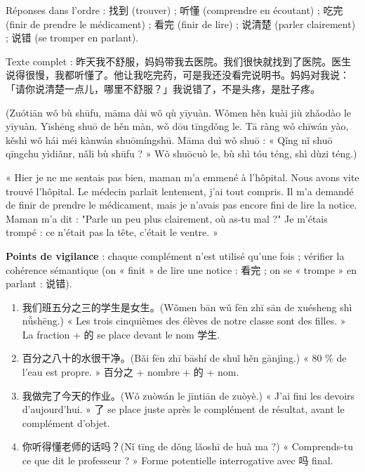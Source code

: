 \documentclass[11pt]{article}
\begin{document}
\begin{corrige}
Réponses dans l'ordre : 找到 (trouver) ; 听懂 (comprendre en écoutant) ; 吃完 (finir de prendre le médicament) ; 看完 (finir de lire) ; 说清楚 (parler clairement) ; 说错 (se tromper en parlant).

Texte complet : 昨天我不舒服，妈妈带我去医院。我们很快就找到了医院。医生说得很慢，我都听懂了。他让我吃完药，可是我还没看完说明书。妈妈对我说：「请你说清楚一点儿，哪里不舒服？」我说错了，不是头疼，是肚子疼。

(Zuótiān wǒ bù shūfu, māma dài wǒ qù yīyuàn. Wǒmen hěn kuài jiù zhǎodào le yīyuàn. Yīshēng shuō de hěn màn, wǒ dōu tīngdǒng le. Tā ràng wǒ chīwán yào, kěshì wǒ hái méi kànwán shuōmíngshū. Māma duì wǒ shuō : « Qǐng nǐ shuō qīngchu yìdiǎnr, nǎli bù shūfu ? » Wǒ shuōcuò le, bù shì tóu téng, shì dùzi téng.)

« Hier je ne me sentais pas bien, maman m'a emmené à l'hôpital. Nous avons vite trouvé l'hôpital. Le médecin parlait lentement, j'ai tout compris. Il m'a demandé de finir de prendre le médicament, mais je n'avais pas encore fini de lire la notice. Maman m'a dit : "Parle un peu plus clairement, où as-tu mal ?" Je m'étais trompé : ce n'était pas la tête, c'était le ventre. »

\textbf{Points de vigilance} : chaque complément n'est utilisé qu'une fois ; vérifier la cohérence sémantique (on « finit » de lire une notice : 看完 ; on se « trompe » en parlant : 说错).
\end{corrige}

\begin{corrige}
\begin{enumerate}
\item 我们班五分之三的学生是女生。(Wǒmen bān wǔ fēn zhī sān de xuésheng shì nǚshēng.) « Les trois cinquièmes des élèves de notre classe sont des filles. » La fraction + 的 se place devant le nom 学生.
\item 百分之八十的水很干净。(Bǎi fēn zhī bāshí de shuǐ hěn gānjìng.) « 80 \% de l'eau est propre. » 百分之 + nombre + 的 + nom.
\item 我做完了今天的作业。(Wǒ zuòwán le jīntiān de zuòyè.) « J'ai fini les devoirs d'aujourd'hui. » 了 se place juste après le complément de résultat, avant le complément d'objet.
\item 你听得懂老师的话吗？(Nǐ tīng de dǒng lǎoshī de huà ma ?) « Comprends-tu ce que dit le professeur ? » Forme potentielle interrogative avec 吗 final.
\end{enumerate}
\end{corrige}
\end{document}
